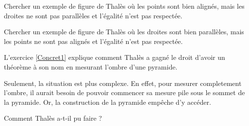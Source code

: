 



Chercher un exemple de figure de Thalès où les points sont bien alignés, mais les droites ne sont pas parallèles et l'égalité n'est pas respectée.


Chercher un exemple de figure de Thalès où les droites sont bien parallèles, mais les points ne sont pas alignés et l'égalité n'est pas respectée.


L'exercice \ref{Concret1} explique comment Thalès a gagné le droit d'avoir un théorème à son nom en mesurant l'ombre d'une pyramide. 

Seulement, la situation est plus complexe. En effet, pour mesurer completement l'ombre, il aurait besoin de pouvoir commencer sa mesure pile sous le sommet de la pyramide. Or, la construction de la pyramide empêche d'y accéder.

Comment Thalès a-t-il pu faire ?